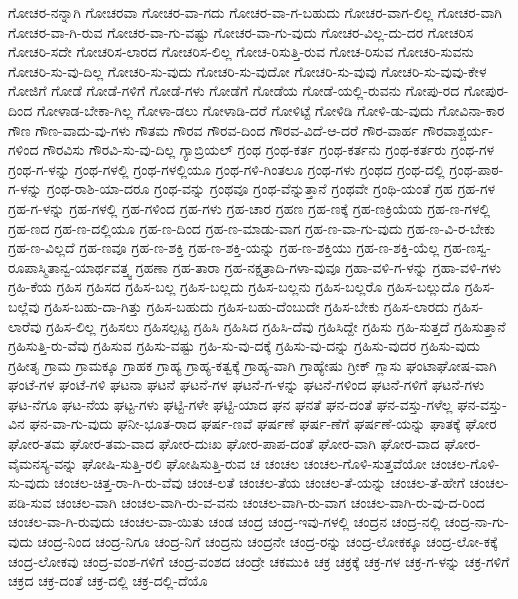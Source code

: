 {ಗೋಚರ-ನನ್ನಾಗಿ
ಗೋಚರವಾ
ಗೋಚರ-ವಾ-ಗದು
ಗೋಚರ-ವಾ-ಗ-ಬಹುದು
ಗೋಚರ-ವಾಗ-ಲಿಲ್ಲ
ಗೋಚರ-ವಾಗಿ
ಗೋಚರ-ವಾ-ಗಿ-ರುವ
ಗೋಚರ-ವಾ-ಗು-ವಷ್ಟು
ಗೋಚರ-ವಾ-ಗು-ವುದು
ಗೋಚರ-ವಿಲ್ಲ-ದು-ದರ
ಗೋಚರಿಸ
ಗೋಚರಿ-ಸದೇ
ಗೋಚರಿಸ-ಲಾರದ
ಗೋಚರಿಸ-ಲಿಲ್ಲ
ಗೋಚ-ರಿಸುತ್ತಿ-ರುವ
ಗೋಚ-ರಿಸುವ
ಗೋಚರಿ-ಸುವನು
ಗೋಚರಿ-ಸು-ವು-ದಿಲ್ಲ
ಗೋಚರಿ-ಸು-ವುದು
ಗೋಚರಿ-ಸು-ವುದೋ
ಗೋಚರಿ-ಸು-ವುವು
ಗೋಚರಿ-ಸು-ವುವು-ಕೇಳ
ಗೋಜಿಗೆ
ಗೋಡೆ
ಗೋಡೆ-ಗಳಿಗೆ
ಗೋಡೆ-ಗಳು
ಗೋಡೆಗೆ
ಗೋಡೆಯ
ಗೋಡೆ-ಯಲ್ಲಿ-ರುವನು
ಗೋಪು-ರದ
ಗೋಪುರ-ದಿಂದ
ಗೋಳಾಡ-ಬೇಕಾ-ಗಿಲ್ಲ
ಗೋಳಾ-ಡಲು
ಗೋಳಾಡಿ-ದರೆ
ಗೋಳಿಟ್ಟೆ
ಗೋಳಿಡಿ
ಗೋಳಿ-ಡು-ವುದು
ಗೋವಿನಾ-ಕಾರ
ಗೌಣ
ಗೌಣ-ವಾದು-ವು-ಗಳು
ಗೌತಮ
ಗೌರವ
ಗೌರವ-ದಿಂದ
ಗೌರವ-ವಿದೆ-ಆ-ದರೆ
ಗೌರ-ವಾರ್ಹ
ಗೌರವಾಶ್ಚರ್ಯ-ಗಳಿಂದ
ಗೌರವಿಸು
ಗೌರವಿ-ಸು-ವು-ದಿಲ್ಲ
ಗ್ಯಾಬ್ರಿಯಲ್
ಗ್ರಂಥ
ಗ್ರಂಥ-ಕರ್ತ
ಗ್ರಂಥ-ಕರ್ತನು
ಗ್ರಂಥ-ಕರ್ತರು
ಗ್ರಂಥ-ಗಳ
ಗ್ರಂಥ-ಗ-ಳನ್ನು
ಗ್ರಂಥ-ಗಳಲ್ಲಿ
ಗ್ರಂಥ-ಗಳಲ್ಲಿಯೂ
ಗ್ರಂಥ-ಗಳಿ-ಗಿಂತಲೂ
ಗ್ರಂಥ-ಗಳು
ಗ್ರಂಥದ
ಗ್ರಂಥ-ದಲ್ಲಿ
ಗ್ರಂಥ-ಪಾಠ-ಗ-ಳನ್ನು
ಗ್ರಂಥ-ರಾಶಿ-ಯಾ-ದರೂ
ಗ್ರಂಥ-ವನ್ನು
ಗ್ರಂಥವೂ
ಗ್ರಂಥ-ವೆನ್ನುತ್ತಾನೆ
ಗ್ರಂಥವೇ
ಗ್ರಂಥಿ-ಯಂತೆ
ಗ್ರಹ
ಗ್ರಹ-ಗಳ
ಗ್ರಹ-ಗ-ಳನ್ನು
ಗ್ರಹ-ಗಳಲ್ಲಿ
ಗ್ರಹ-ಗಳಿಂದ
ಗ್ರಹ-ಗಳು
ಗ್ರಹ-ಚಾರ
ಗ್ರಹಣ
ಗ್ರಹ-ಣಕ್ಕೆ
ಗ್ರಹ-ಣಕ್ರಿಯೆಯ
ಗ್ರಹ-ಣ-ಗಳಲ್ಲಿ
ಗ್ರಹ-ಣದ
ಗ್ರಹ-ಣ-ದಲ್ಲಿಯೂ
ಗ್ರಹ-ಣ-ದಿಂದ
ಗ್ರಹ-ಣ-ಮಾಡು-ವಾಗ
ಗ್ರಹ-ಣ-ವಾ-ಗು-ವುದು
ಗ್ರಹ-ಣ-ವಿ-ರ-ಬೇಕು
ಗ್ರಹ-ಣ-ವಿಲ್ಲದೆ
ಗ್ರಹ-ಣವೂ
ಗ್ರಹ-ಣ-ಶಕ್ತಿ
ಗ್ರಹ-ಣ-ಶಕ್ತಿ-ಯನ್ನು
ಗ್ರಹ-ಣ-ಶಕ್ತಿಯು
ಗ್ರಹ-ಣ-ಶಕ್ತಿ-ಯೆಲ್ಲ
ಗ್ರಹ-ಣಸ್ವ-ರೂಪಾಸ್ಮಿತಾನ್ವ-ಯಾರ್ಥವತ್ತ್ವ
ಗ್ರಹಣಾ
ಗ್ರಹ-ತಾರಾ
ಗ್ರಹ-ನಕ್ಷತ್ರಾದಿ-ಗಳಾ-ವುವೂ
ಗ್ರಹಾ-ವಳಿ-ಗ-ಳನ್ನು
ಗ್ರಹಾ-ವಳಿ-ಗಳು
ಗ್ರಹಿ-ಕೆಯ
ಗ್ರಹಿಸ
ಗ್ರಹಿಸದ
ಗ್ರಹಿಸ-ಬಲ್ಲ
ಗ್ರಹಿಸ-ಬಲ್ಲದು
ಗ್ರಹಿಸ-ಬಲ್ಲನು
ಗ್ರಹಿಸ-ಬಲ್ಲರೊ
ಗ್ರಹಿಸ-ಬಲ್ಲುದೊ
ಗ್ರಹಿಸ-ಬಲ್ಲೆವು
ಗ್ರಹಿಸ-ಬಹು-ದಾ-ಗಿತ್ತು
ಗ್ರಹಿಸ-ಬಹುದು
ಗ್ರಹಿಸ-ಬಹು-ದೆಂಬುದೇ
ಗ್ರಹಿಸ-ಬೇಕು
ಗ್ರಹಿಸ-ಲಾರದು
ಗ್ರಹಿಸ-ಲಾರೆವು
ಗ್ರಹಿಸ-ಲಿಲ್ಲ
ಗ್ರಹಿಸಲು
ಗ್ರಹಿಸಲ್ಪಟ್ಟ
ಗ್ರಹಿಸಿ
ಗ್ರಹಿಸಿದ
ಗ್ರಹಿಸಿ-ದೆವು
ಗ್ರಹಿಸಿದ್ದೇ
ಗ್ರಹಿಸು
ಗ್ರಹಿ-ಸುತ್ತದೆ
ಗ್ರಹಿಸುತ್ತಾನೆ
ಗ್ರಹಿಸುತ್ತಿ-ರು-ವೆವು
ಗ್ರಹಿಸುವ
ಗ್ರಹಿಸು-ವಷ್ಟು
ಗ್ರಹಿ-ಸು-ವು-ದಕ್ಕೆ
ಗ್ರಹಿಸು-ವು-ದನ್ನು
ಗ್ರಹಿಸು-ವುದರ
ಗ್ರಹಿಸು-ವುದು
ಗ್ರಹೀತೃ
ಗ್ರಾಮ
ಗ್ರಾಮಕ್ಕೂ
ಗ್ರಾಹಕ
ಗ್ರಾಹ್ಯ
ಗ್ರಾಹ್ಯ-ಕತ್ವಕ್ಕೆ
ಗ್ರಾಹ್ಯ-ವಾಗಿ
ಗ್ರಾಹ್ಯೇಷು
ಗ್ರೀಕ್
ಗ್ಲಾಸು
ಘಂಟಾಘೋಷ-ವಾಗಿ
ಘಂಟೆ-ಗಳ
ಘಂಟೆ-ಗಳಿ
ಘಟನಾ
ಘಟನೆ
ಘಟನೆ-ಗಳ
ಘಟನೆ-ಗ-ಳನ್ನು
ಘಟನೆ-ಗಳಿಂದ
ಘಟನೆ-ಗಳಿಗೆ
ಘಟನೆ-ಗಳು
ಘಟ-ನೆಗೂ
ಘಟ-ನೆಯ
ಘಟ್ಟ-ಗಳು
ಘಟ್ಟಿ-ಗಳೇ
ಘಟ್ಟಿ-ಯಾದ
ಘನ
ಘನತೆ
ಘನ-ದಂತೆ
ಘನ-ವಸ್ತು-ಗಳೆಲ್ಲ
ಘನ-ವಸ್ತು-ವಿನ
ಘನ-ವಾ-ಗು-ವುದು
ಘನೀ-ಭೂತ-ರಾದ
ಘರ್ಷ-ಣವೆ
ಘರ್ಷಣೆ
ಘರ್ಷ-ಣೆಗೆ
ಘರ್ಷಣೆ-ಯನ್ನು
ಘಾತಕ್ಕೆ
ಘೋರ
ಘೋರ-ತಮ
ಘೋರ-ತಮ-ವಾದ
ಘೋರ-ದುಃಖ
ಘೋರ-ಪಾಪ-ದಂತೆ
ಘೋರ-ವಾಗಿ
ಘೋರ-ವಾದ
ಘೋರ-ವೈಮನಸ್ಯ-ವನ್ನು
ಘೋಷಿ-ಸುತ್ತಿ-ರಲಿ
ಘೋಷಿಸುತ್ತಿ-ರುವ
ಚ
ಚಂಚಲ
ಚಂಚಲ-ಗೊಳಿ-ಸುತ್ತವೆಯೋ
ಚಂಚಲ-ಗೊಳಿ-ಸು-ವುದು
ಚಂಚಲ-ಚಿತ್ತ-ರಾ-ಗಿ-ರು-ವೆವು
ಚಂಚ-ಲತೆ
ಚಂಚಲ-ತೆಯ
ಚಂಚಲ-ತೆ-ಯನ್ನು
ಚಂಚಲ-ತೆ-ಹೇಗೆ
ಚಂಚಲ-ಪಡಿ-ಸುವ
ಚಂಚಲ-ವಾಗಿ
ಚಂಚಲ-ವಾಗಿ-ರು-ವ-ವನು
ಚಂಚಲ-ವಾಗಿ-ರು-ವಾಗ
ಚಂಚಲ-ವಾಗಿ-ರು-ವು-ದ-ರಿಂದ
ಚಂಚಲ-ವಾ-ಗಿ-ರುವುದು
ಚಂಚಲ-ವಾ-ಯಿತು
ಚಂಡ
ಚಂದ್ರ
ಚಂದ್ರ-ಇವು-ಗಳಲ್ಲಿ
ಚಂದ್ರನ
ಚಂದ್ರ-ನಲ್ಲಿ
ಚಂದ್ರ-ನಾ-ಗು-ವುದು
ಚಂದ್ರ-ನಿಂದ
ಚಂದ್ರ-ನಿಗೂ
ಚಂದ್ರ-ನಿಗೆ
ಚಂದ್ರನು
ಚಂದ್ರನೇ
ಚಂದ್ರ-ರನ್ನು
ಚಂದ್ರ-ಲೋಕಕ್ಕೂ
ಚಂದ್ರ-ಲೋ-ಕಕ್ಕೆ
ಚಂದ್ರ-ಲೋಕವು
ಚಂದ್ರ-ವಂಶ-ಗಳಿಗೆ
ಚಂದ್ರ-ವಂಶದ
ಚಂದ್ರೇ
ಚಕಮುಕಿ
ಚಕ್ರ
ಚಕ್ರಕ್ಕೆ
ಚಕ್ರ-ಗಳ
ಚಕ್ರ-ಗ-ಳನ್ನು
ಚಕ್ರ-ಗಳಿಗೆ
ಚಕ್ರದ
ಚಕ್ರ-ದಂತೆ
ಚಕ್ರ-ದಲ್ಲಿ
ಚಕ್ರ-ದಲ್ಲಿ-ದೆಯೊ
}

